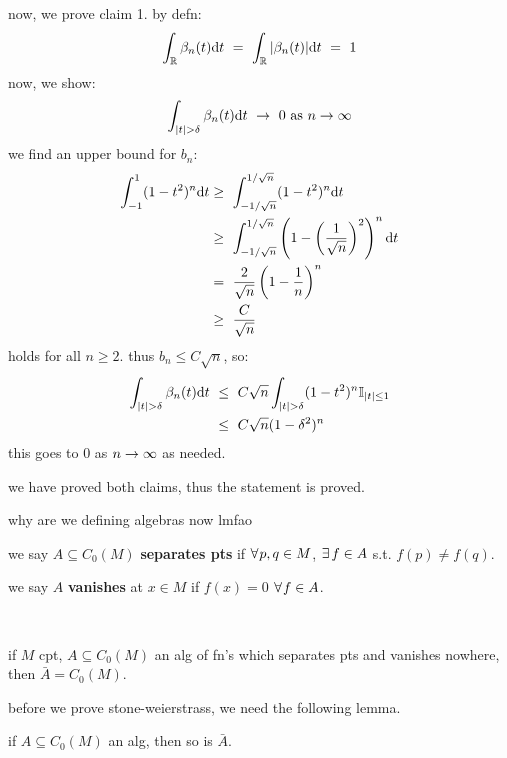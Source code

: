 \begin{pf}[source=Primary Source Material]
	now, we prove claim 1. by defn:
	\begin{equation*}
		\int_{\mathbb{R}}\beta_{n}(t)\textrm{d} t
		\ = \ \int_{\mathbb{R}}\abs{\beta_{n}(t)}\textrm{d} t \ = \ 1
	\end{equation*}
	now, we show:
	\begin{equation*}
		\int_{\abs{t}>\delta}\beta_{n}(t)\d t \ \sto \ 0 \trm{ as } n\sto\infty
	\end{equation*}
	we find an upper bound for $b_{n}$:
	\begin{align*}
		\int_{-1}^{1}(1-t^{2})^{n}\d t
		& \geq \ \int_{-1/\sqrt{n}}^{1/\sqrt{n}}(1-t^{2})^{n}\d t \\
		& \geq \ \int_{-1/\sqrt{n}}^{1/\sqrt{n}}\left(1-\left(\frac{1}{\sqrt{n}}\right)^{2}\right)^{n}\d t \\
		& = \ \frac{2}{\sqrt{n}}\left(1-\frac{1}{n}\right)^{n} \\
		& \geq \ \frac{C}{\sqrt{n}}
	\end{align*}
	holds for all $n\geq2$. thus $b_{n}\leq C\sqrt{n}$, so:
	\begin{align*}
		\int_{\abs{t}>\delta}\beta_{n}(t)\d t
		& \ \leq \ C\sqrt{n}\int_{\abs{t}>\delta}(1-t^{2})^{n}\bb{I}_{\abs{t}\leq1} \\
		& \ \leq \ C\sqrt{n}(1-\delta^{2})^{n}
	\end{align*}
	this goes to 0 as $n\rightarrow\infty$ as needed.

	we have proved both claims, thus the statement is proved.
\end{pf}

why are we defining algebras now lmfao

\begin{defn}
	we say $A\subseteq C_{0}(M)$ \textbf{separates pts} if $\fa p,q\in M$, $\ex f\in A$ s.t.
	$f(p)\neq f(q)$.

	we say $A$ \textbf{vanishes} at $x\in M$ if $f(x)=0$ $\fa f\in A$.
\end{defn} \

\begin{thm}[title=Stone-Weierstrass]
	if $M$ cpt, $A\subseteq C_{0}(M)$ an alg of fn's which separates pts and
	vanishes nowhere, then $\bar{A}=C_{0}(M)$.
\end{thm}


before we prove stone-weierstrass, we need the following lemma.
\begin{lm}
	if $A\subseteq C_{0}(M)$ an alg, then so is $\bar{A}$.
\end{lm}


